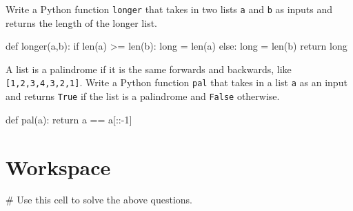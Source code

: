 \documentclass{ximera}
\begin{document}
\begin{question}
Write a Python function \verb|longer| that takes in two lists \verb|a| and \verb|b| as inputs and returns the length of the longer list.
	\begin{hint}
\begin{sageCell}
def longer(a,b):
        if len(a) >= len(b):
                long = len(a)
        else:
                long = len(b)
        return long
\end{sageCell}
	\end{hint}
\end{question}

\begin{question}
A list is a palindrome if it is the same forwards and backwards, like \verb|[1,2,3,4,3,2,1]|. Write a Python function \verb|pal| that takes in a list \verb|a| as an input and returns \verb|True| if the list is a palindrome and \verb|False| otherwise.
	\begin{hint}
\begin{sageCell}
def pal(a):
        return a == a[::-1]
\end{sageCell}
	\end{hint}
\end{question}

\section{Workspace}

\begin{sageCell}
# Use this cell to solve the above questions.
\end{sageCell}
\end{document}

